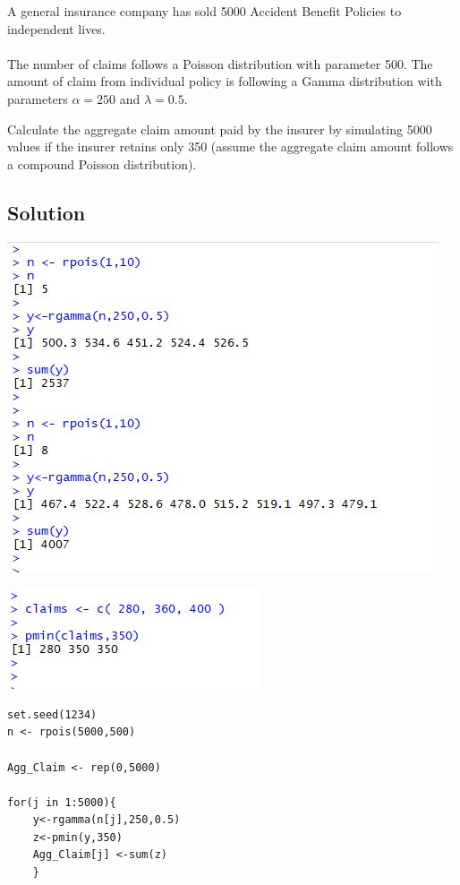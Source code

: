 \documentclass[a4paper,12pt]{article}
\begin{document}
\large 
\noindent A general insurance company has sold 5000 Accident Benefit Policies to independent lives.\\\\
\medskip
\noindent The number of claims follows a Poisson distribution with parameter 500. The amount of claim
from individual policy is following a Gamma distribution with parameters $\alpha = 250$ and $\lambda = 0.5$.\\
\medskip

\noindent Calculate the aggregate claim amount paid by the insurer by simulating 5000 values if the
insurer retains only 350 (assume the aggregate claim amount follows a compound Poisson
distribution). 

\subsection*{Solution}


\includegraphics[scale=1.3]{00-B2/images/B2_Agg_Claim_CompoundPoisson.JPG}

\bigskip
\includegraphics[scale=1.4]{00-B2/images/B2-PairwiseMinimum.JPG}
\newpage 
\begin{framed}
\begin{verbatim}
set.seed(1234)
n <- rpois(5000,500)

Agg_Claim <- rep(0,5000)

for(j in 1:5000){
    y<-rgamma(n[j],250,0.5)
    z<-pmin(y,350)
    Agg_Claim[j] <-sum(z)
    }

\end{verbatim}
\end{framed}
\end{document}
